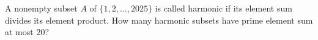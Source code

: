A nonempty subset $A$ of $\{1,2,\ldots,2025\}$ is called harmonic if its element sum divides its element product. How many harmonic subsets have prime element sum at most $20$?
